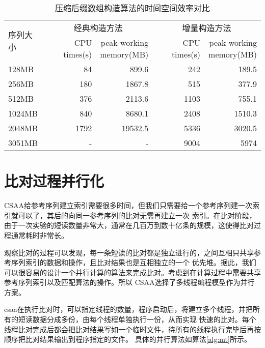 \begin{table}
    \caption{压缩后缀数组构造算法的时间空间效率对比}
    \label{tab:index}
    \centering
    \begin{tabular}{lrrrr}
        \toprule
        \multirow{2}{*}{序列大小}&\multicolumn{2}{c}{经典构造方法}&\multicolumn{2}{c}{增量构造方法}\\
        \cline{2-3}
        \cline{4-5}
        &CPU times(s) & \tabincell{l}{peak working\\memory(MB)}&CPU times(s)& \tabincell{l}{peak working \\memory(MB)}\\
        \midrule
        128MB& 84 & 899.6 & 242 & 189.5\\
        256MB& 180 & 1867.8 & 515 & 377.9\\
        512MB& 376 & 2113.6 & 1103 & 755.1\\
        1024MB& 840 & 8680.1 & 2408 & 1510.3\\
        2048MB& 1792 & 19532.5 & 5336 & 3020.5\\
        3051MB& - & - & 9004 & 5974\\
        \bottomrule
    \end{tabular}
\end{table}


\section{比对过程并行化}
CSAA给参考序列建立索引需要很多时间，但我们只需要给一个参考序列建一次索引就可以了，其后的向同一参考序列的比对无需再建立一次
索引。在比对阶段，由于一次实验的短读数量非常大，通常在几百万到数十亿条的规模，这使得比对过程通常耗时非常长。

观察比对的过程可以发现，每一条短读的比对都是独立进行的，之间互相只共享参考序列索引的数据和操作，且比对结果也是互相独立的一个
优先堆。据此，我们可以很容易的设计一个并行计算的算法来完成比对。考虑到在计算过程中需要共享参考序列索引以及匹配算法的操作。所以
CSAA选择了多线程编程模型作为并行方案。

csaa在执行比对时，可以指定线程的数量，程序启动后，将建立多个线程，并把所有的短读数据分成多份，由每个线程单独执行一份，从而实现
快速的比对。每个线程比对完成后都会把比对结果写如一个临时文件，待所有的线程执行完毕后再按顺序把比对结果输出到程序指定的文件。
具体的并行算法如算法\ref{alg:mt}所示。

